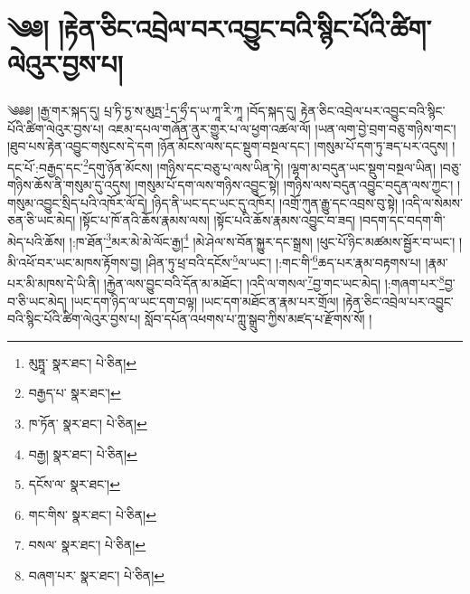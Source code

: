 \setcounter{footnote}{0} 
\chapter{༄༅། །རྟེན་ཅིང་འབྲེལ་བར་འབྱུང་བའི་སྙིང་པོའི་ཚིག་ལེའུར་བྱས་པ།}༄༅༅། །རྒྱ་གར་སྐད་དུ། པྲ་ཏི་ཏྱ་ས་མུཏྤ་\footnote{མུཏྤཱ་  སྣར་ཐང་།  པེ་ཅིན། }ད་ཧྲྀ་ད་ཡ་ཀཱ་རི་ཀཱ །བོད་སྐད་དུ། རྟེན་ཅིང་འབྲེལ་པར་འབྱུང་བའི་སྙིང་པོའི་ཚིག་ལེའུར་བྱས་པ། འཇམ་དཔལ་གཞོན་ནུར་གྱུར་པ་ལ་ཕྱག་འཚལ་ལོ། །ཡན་ལག་བྱེ་བྲག་བཅུ་གཉིས་གང་། །ཐུབ་པས་རྟེན་འབྱུང་གསུངས་དེ་དག །ཉོན་མོངས་ལས་དང་སྡུག་བསྔལ་དང་། །གསུམ་པོ་དག་ཏུ་ཟད་པར་འདུས། །དང་པོ་:བརྒྱད་དང་\footnote{བརྒྱད་པ་  སྣར་ཐང་། }དགུ་ཉོན་མོངས། །གཉིས་དང་བཅུ་པ་ལས་ཡིན་ཏེ། །ལྷག་མ་བདུན་ཡང་སྡུག་བསྔལ་ཡིན། །བཅུ་གཉིས་ཆོས་ནི་གསུམ་དུ་འདུས། །གསུམ་པོ་དག་ལས་གཉིས་འབྱུང་སྟེ། །གཉིས་ལས་བདུན་འབྱུང་བདུན་ལས་ཀྱང་། །གསུམ་འབྱུང་སྲིད་པའི་འཁོར་ལོ་དེ། །ཉིད་ནི་ཡང་དང་ཡང་དུ་འཁོར། །འགྲོ་ཀུན་རྒྱུ་དང་འབྲས་བུ་སྟེ། །འདི་ལ་སེམས་ཅན་ཅི་ཡང་མེད། །སྟོང་པ་ཁོ་ནའི་ཆོས་རྣམས་ལས། །སྟོང་པའི་ཆོས་རྣམས་འབྱུང་བ་ཟད། །བདག་དང་བདག་གི་མེད་པའི་ཆོས། །:ཁ་ཐོན་\footnote{ཁ་ཏོན་  སྣར་ཐང་།  པེ་ཅིན། }མར་མེ་མེ་ལོང་རྒྱ།\footnote{བརྒྱ།  སྣར་ཐང་།  པེ་ཅིན། } །མེ་ཤེལ་ས་བོན་སྐྱུར་དང་སྒྲས། །ཕུང་པོ་ཉིང་མཚམས་སྦྱོར་བ་ཡང་། །མི་འཕོ་བར་ཡང་མཁས་རྟོགས་བྱ། །ཤིན་ཏུ་ཕྲ་བའི་དངོས་\footnote{དངོས་ལ་  སྣར་ཐང་། }ལ་ཡང་། །:གང་གི་\footnote{གང་གིས་  སྣར་ཐང་།  པེ་ཅིན། }ཆད་པར་རྣམ་བརྟགས་པ། །རྣམ་པར་མི་མཁས་དེ་ཡི་ནི། །རྐྱེན་ལས་བྱུང་བའི་དོན་མ་མཐོང་། །འདི་ལ་གསལ་\footnote{བསལ་  སྣར་ཐང་།  པེ་ཅིན། }བྱ་གང་ཡང་མེད། །:གཞག་པར་\footnote{བཞག་པར་  སྣར་ཐང་།  པེ་ཅིན། }བྱ་བ་ཅི་ཡང་མེད། །ཡང་དག་ཉིད་ལ་ཡང་དག་བལྟ། །ཡང་དག་མཐོང་ན་རྣམ་པར་གྲོལ། །རྟེན་ཅིང་འབྲེལ་པར་འབྱུང་བའི་སྙིང་པོའི་ཚིག་ལེའུར་བྱས་པ། སློབ་དཔོན་འཕགས་པ་ཀླུ་སྒྲུབ་ཀྱིས་མཛད་པ་རྫོགས་སོ། ། 